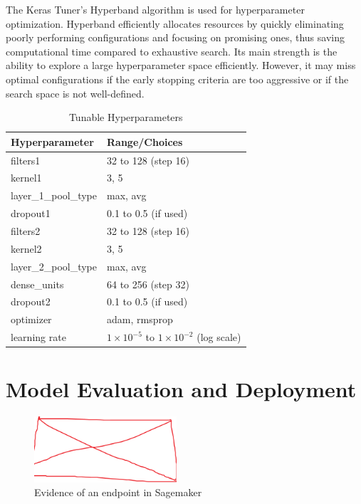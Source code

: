 The Keras Tuner's Hyperband algorithm is used for hyperparameter optimization. Hyperband efficiently allocates resources by quickly eliminating poorly performing configurations and focusing on promising ones, thus saving computational time compared to exhaustive search. Its main strength is the ability to explore a large hyperparameter space efficiently. However, it may miss optimal configurations if the early stopping criteria are too aggressive or if the search space is not well-defined.

\begin{table}[h]
\centering
\caption{Tunable Hyperparameters}
\begin{tabular}{ll}
\toprule
\textbf{Hyperparameter} & \textbf{Range/Choices} \\
\midrule
filters1         & 32 to 128 (step 16) \\
kernel1          & 3, 5 \\
layer\_1\_pool\_type & max, avg \\
dropout1         & 0.1 to 0.5 (if used) \\
filters2         & 32 to 128 (step 16) \\
kernel2          & 3, 5 \\
layer\_2\_pool\_type & max, avg \\
dense\_units     & 64 to 256 (step 32) \\
dropout2         & 0.1 to 0.5 (if used) \\
optimizer        & adam, rmsprop \\
learning rate    & $1\times10^{-5}$ to $1\times10^{-2}$ (log scale) \\
\bottomrule
\end{tabular}
\end{table}


\section{Model Evaluation and Deployment}


\begin{figure}[h]
    \centering
    \includegraphics[width=200px]{figures/placeholder.png} %
    \centering
    \caption{Evidence of an endpoint in Sagemaker} %
    \label{fig:endpoint} %
\end{figure}

